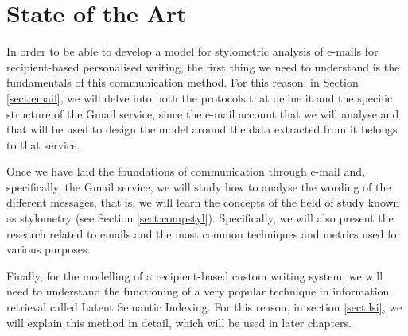 \chapter{State of the Art}
\label{cap:estadoDeLaCuestion}

In order to be able to develop a model for stylometric analysis of e-mails for recipient-based personalised writing, the first thing we need to understand is the fundamentals of this communication method. For this reason, in Section \ref{sect:email}, we will delve into both the protocols that define it and the specific structure of the Gmail service, since the e-mail account that we will analyse and that will be used to design the model around the data extracted from it belongs to that service.

Once we have laid the foundations of communication through e-mail and, specifically, the Gmail service, we will study how to analyse the wording of the different messages, that is, we will learn the concepts of the field of study known as stylometry (see Section \ref{sect:compstyl}). Specifically, we will also present the research related to emails and the most common techniques and metrics used for various purposes.

Finally, for the modelling of a recipient-based custom writing system, we will need to understand the functioning of a very popular technique in information retrieval called Latent Semantic Indexing. For this reason, in section \ref{sect:lsi}, we will explain this method in detail, which will be used in later chapters.





